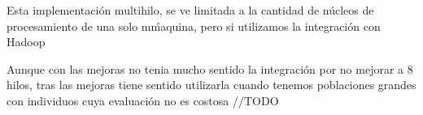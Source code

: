 Esta implementación multihilo, se ve limitada a la cantidad de núcleos de procesamiento de una solo m\'maquina, pero si utilizamos la integración con Hadoop

Aunque con las mejoras no tenia mucho sentido la integración por no mejorar a 8 hilos, tras las mejoras tiene sentido utilizarla cuando tenemos poblaciones grandes con individuos cuya evaluación no es costosa
//TODO